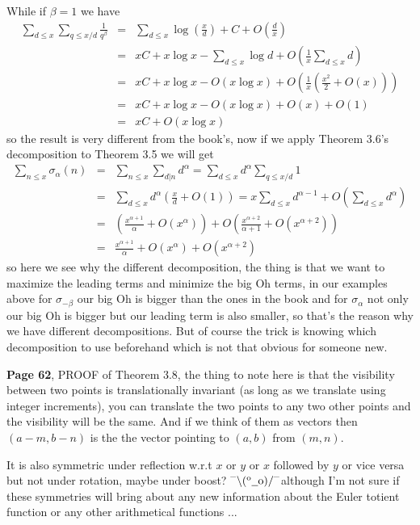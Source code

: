 \documentclass[aps,preprint,preprintnumbers,nofootinbib,showpacs,prd]{revtex4-1}
\newcommand{\nbea}{\begin{eqnarray*}}
\newcommand{\neea}{\end{eqnarray*}}
\newcommand{\dunno}{$ {}^{\mbox {--}}\backslash(^{\rm o}{}\underline{\hspace{0.2cm}}{\rm o})/^{\mbox {--}}$}
\begin{document}
While if $\beta = 1$ we have
%
\nbea
\sum_{d\le x} \sum_{q\le x/d}\frac{1}{q^\beta} & = & \sum_{d\le x} \log \left ( \frac{x}{d}\right ) + C + O\left ( \frac{d}{x}\right ) \\
& = & xC + x \log x - \sum_{d\le x} \log d + O\left ( \frac{1}{x} \sum_{d\le x} d\right ) \\
& = & xC + x \log x - O(x \log x) + O\left ( \frac{1}{x} \left (\frac{x^2}{2} + O(x)\right )\right ) \\
& = & xC + x \log x - O(x \log x) + O(x) + O(1)\\
& = & xC + O(x \log x)
\neea
%
so the result is very different from the book's, now if we apply Theorem 3.6's decomposition to Theorem 3.5 we will get
%
\nbea
\sum_{n \le x} \sigma_\alpha(n) & = & \sum_{n \le x} \sum_{d|n} d^{\alpha} = \sum_{d \le x} d^\alpha \sum_{q \le x/d} 1 \\
& = & \sum_{d \le x} d^\alpha \left ( \frac{x}{d} + O(1) \right ) = x \sum_{d \le x} d^{\alpha-1} + O \left ( \sum_{d \le x} d^\alpha \right ) \\
& = & \left ( \frac{x^{\alpha+1}}{\alpha}  + O(x^{\alpha}) \right ) + O\left ( \frac{x^{\alpha+2}}{\alpha+1} + O\left( x^{\alpha + 2}\right )\right ) \\
& = & \frac{x^{\alpha+1}}{\alpha}  + O(x^{\alpha}) + O\left( x^{\alpha + 2}\right )
\neea
%
so here we see why the different decomposition, the thing is that we want to maximize the leading terms and minimize the big Oh terms, in our examples above for $\sigma_{-\beta}$ our big Oh is bigger than the ones in the book and for $\sigma_\alpha$ not only our big Oh is bigger but our leading term is also smaller, so that's the reason why we have different decompositions. But of course the trick is knowing which decomposition to use beforehand which is not that obvious for someone new.

{\bf Page 62}, PROOF of Theorem 3.8, the thing to note here is that the visibility between two points is translationally  invariant (as long as we translate using integer increments), you can translate the two points to any two other points and the visibility will be the same. And if we think of them as vectors then $(a-m,b-n)$ is the the vector pointing to $(a,b)$ from $(m,n)$.

It is also symmetric under reflection w.r.t $x$ or $y$ or $x$ followed by $y$ or vice versa but not under rotation, maybe under boost? \dunno although I'm not sure if these symmetries will bring about any new information about the Euler totient function or any other arithmetical functions ...
\end{document}
